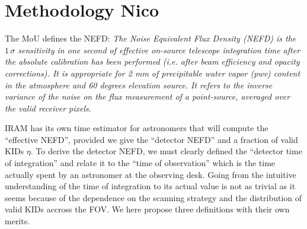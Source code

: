 


\section{Methodology {\color{blue} Nico}}

The MoU defines the NEFD:  \emph{The Noise Equivalent Flux Density (NEFD)
  is the $1\,\sigma$ sensitivity in one second of effective on-source telescope
  integration time after the absolute calibration has been performed (i.e. after
  beam efficiency and opacity corrections). It is appropriate for 2 mm of
  precipitable water vapor (pwv) content in the atmosphere and 60 degrees
  elevation source. It refers to the inverse variance of the noise on the flux
  measurement of a point-source, averaged over the valid receiver pixels}.

IRAM has its own time estimator for astronomers that will compute the ``effective NEFD'',
provided we give the ``detector NEFD'' and a fraction of valid KIDs $\eta$. To
derive the detector NEFD, we must clearly defined the ``detector time of
integration'' and relate it to the ``time of observation'' which is the time
actually spent by an astronomer at the observing desk. Going from the intuitive
understanding of the time of integration to its actual value is not as trivial
as it seems because of the dependence on the scanning strategy and the
distribution of valid KIDs accross the FOV. We here propose three definitions
with their own merits.

